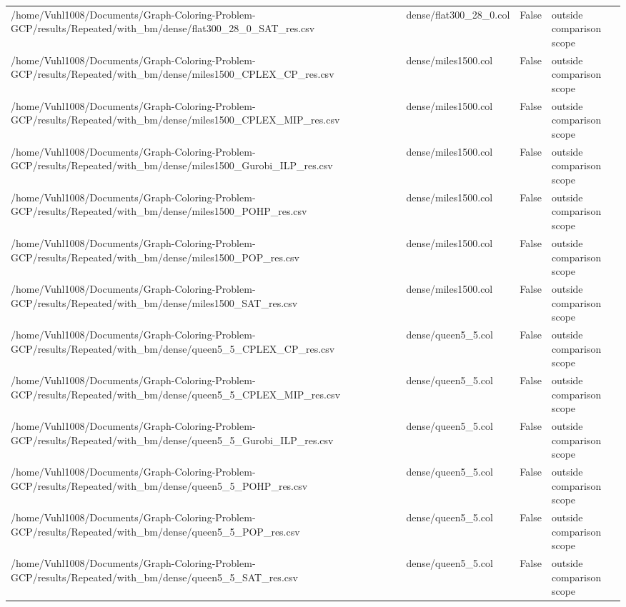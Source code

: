 \begin{table}[htbp]
\begin{tabular}{llll}
/home/Vuhl1008/Documents/Graph-Coloring-Problem-GCP/results/Repeated/with\_bm/dense/flat300\_28\_0\_SAT\_res.csv & dense/flat300\_28\_0.col & False & outside comparison scope \\
/home/Vuhl1008/Documents/Graph-Coloring-Problem-GCP/results/Repeated/with\_bm/dense/miles1500\_CPLEX\_CP\_res.csv & dense/miles1500.col & False & outside comparison scope \\
/home/Vuhl1008/Documents/Graph-Coloring-Problem-GCP/results/Repeated/with\_bm/dense/miles1500\_CPLEX\_MIP\_res.csv & dense/miles1500.col & False & outside comparison scope \\
/home/Vuhl1008/Documents/Graph-Coloring-Problem-GCP/results/Repeated/with\_bm/dense/miles1500\_Gurobi\_ILP\_res.csv & dense/miles1500.col & False & outside comparison scope \\
/home/Vuhl1008/Documents/Graph-Coloring-Problem-GCP/results/Repeated/with\_bm/dense/miles1500\_POHP\_res.csv & dense/miles1500.col & False & outside comparison scope \\
/home/Vuhl1008/Documents/Graph-Coloring-Problem-GCP/results/Repeated/with\_bm/dense/miles1500\_POP\_res.csv & dense/miles1500.col & False & outside comparison scope \\
/home/Vuhl1008/Documents/Graph-Coloring-Problem-GCP/results/Repeated/with\_bm/dense/miles1500\_SAT\_res.csv & dense/miles1500.col & False & outside comparison scope \\
/home/Vuhl1008/Documents/Graph-Coloring-Problem-GCP/results/Repeated/with\_bm/dense/queen5\_5\_CPLEX\_CP\_res.csv & dense/queen5\_5.col & False & outside comparison scope \\
/home/Vuhl1008/Documents/Graph-Coloring-Problem-GCP/results/Repeated/with\_bm/dense/queen5\_5\_CPLEX\_MIP\_res.csv & dense/queen5\_5.col & False & outside comparison scope \\
/home/Vuhl1008/Documents/Graph-Coloring-Problem-GCP/results/Repeated/with\_bm/dense/queen5\_5\_Gurobi\_ILP\_res.csv & dense/queen5\_5.col & False & outside comparison scope \\
/home/Vuhl1008/Documents/Graph-Coloring-Problem-GCP/results/Repeated/with\_bm/dense/queen5\_5\_POHP\_res.csv & dense/queen5\_5.col & False & outside comparison scope \\
/home/Vuhl1008/Documents/Graph-Coloring-Problem-GCP/results/Repeated/with\_bm/dense/queen5\_5\_POP\_res.csv & dense/queen5\_5.col & False & outside comparison scope \\
/home/Vuhl1008/Documents/Graph-Coloring-Problem-GCP/results/Repeated/with\_bm/dense/queen5\_5\_SAT\_res.csv & dense/queen5\_5.col & False & outside comparison scope \\

\end{tabular}
\end{table}
